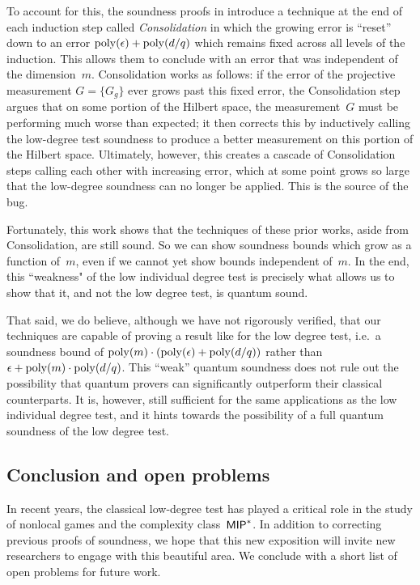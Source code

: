 To account for this,
the soundness proofs in \cite{Vid16, NV18b}
introduce a technique at the end of each induction step
called \emph{Consolidation}
in which the growing error is ``reset''
down to an error $\mathrm{poly}(\epsilon) + \mathrm{poly}(d/q)$
which remains fixed across all levels of the induction.
This allows them to conclude with an error that was independent of the dimension~$m$.
Consolidation works as follows:
if the error of the projective measurement $G = \{G_g\}$
ever grows past this fixed error, the Consolidation step argues that on some portion of the Hilbert space,
the measurement~$G$ must be performing much worse than expected;
it then corrects this by inductively calling the low-degree test soundness to produce a better measurement on this portion of the Hilbert space.
Ultimately, however, this creates a cascade of Consolidation steps calling each other with increasing error,
which at some point grows so large that the low-degree soundness can no longer be applied.
This is the source of the bug.



Fortunately, this work shows that the techniques of these prior works, 
aside from Consolidation,
are still sound.
So we can show soundness bounds which grow as a function of~$m$,
even if we cannot yet show bounds independent of~$m$.
In the end, this ``weakness" of the low individual degree test
is precisely what allows us to show that it, and not the low degree test, is quantum sound.

That said, we do believe, although we have not rigorously verified,
that our techniques are capable of proving a result like  for the low degree test,
i.e.\ a soundness bound of $\mathrm{poly}(m) \cdot (\mathrm{poly}(\epsilon) + \mathrm{poly}(d/q))$ rather than $\epsilon + \mathrm{poly}(m) \cdot \mathrm{poly}(d/q)$.
This ``weak'' quantum soundness does not rule out the possibility that quantum provers can significantly outperform their classical counterparts.
It is, however, still sufficient for the same applications as the low individual degree test,
and it hints towards the possibility of a full quantum soundness of the low degree test.

\subsection{Conclusion and open problems}

In recent years,
the classical low-degree test has played a critical role in the study of nonlocal games
and the complexity class~$\mathsf{MIP}^*$.
In addition to correcting previous proofs of soundness,
we hope that this new exposition
will invite new researchers to engage with this beautiful area.
We conclude with a short list of open problems for future work.

